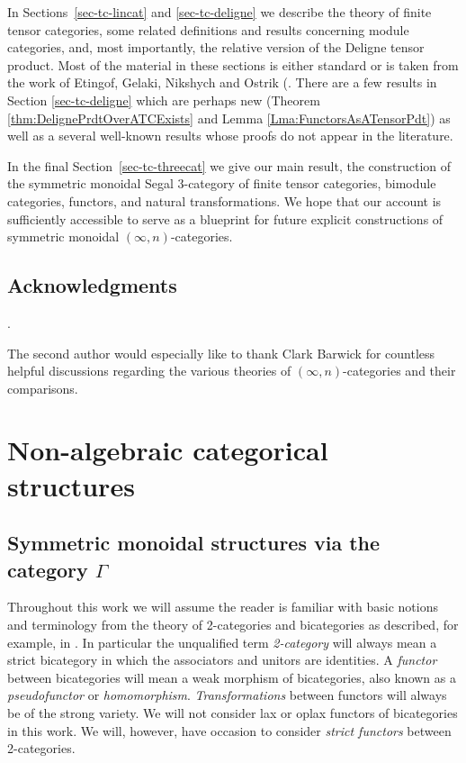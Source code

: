 \documentclass[a4paper]{amsart}
\begin{document}
In Sections~\ref{sec-tc-lincat} and \ref{sec-tc-deligne} we describe the theory of finite tensor categories, some related definitions and results concerning module categories, and, most importantly, the relative version of the Deligne tensor product.  Most of the material in these sections is either standard or is taken from the work of Etingof, Gelaki, Nikshych and Ostrik (\cite{MR1976459,MR2183279,MR2097289, 0909.3140, EGNO}.  There are a few results in Section \ref{sec-tc-deligne} which are perhaps new (Theorem \ref{thm:DelignePrdtOverATCExists} and Lemma \ref{Lma:FunctorsAsATensorPdt}) as well as a several well-known results whose proofs do not appear in the literature. 


In the final Section~\ref{sec-tc-threecat} we give our main result, the construction of the symmetric monoidal Segal 3-category of finite tensor categories,  bimodule categories, functors, and natural transformations. We hope that our account is sufficiently accessible to serve as a blueprint for future explicit constructions of  symmetric monoidal $(\infty,n)$-categories. 




\subsection*{Acknowledgments}.

The second author would especially like to thank Clark Barwick for countless helpful discussions regarding the various theories of $(\infty,n)$-categories and their comparisons. 



\section{Non-algebraic categorical structures}

\subsection{Symmetric monoidal structures via the category $\Gamma$} \label{sec-symmonGamma}

Throughout this work we will assume the reader is familiar with basic notions and terminology from the theory of 2-categories and bicategories as described, for example, in \cite{math.CT/9810017}. In particular the unqualified term {\em 2-category} will always mean a strict bicategory in which the associators and unitors are identities. A {\em functor} between bicategories will mean a weak morphism of bicategories, also known as a {\em pseudofunctor} or {\em homomorphism}. {\em Transformations} between functors will always be of the strong variety. We will not consider lax or oplax functors of bicategories in this work. We will, however, have occasion to consider {\em strict functors} between 2-categories. 
\end{document}
